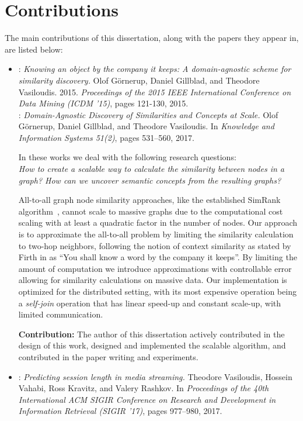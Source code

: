 \section{Contributions}

The main contributions of this dissertation, along with the papers they appear in,
are listed below:

\begin{itemize}
	\item \textbf{\conceptsicdm}: \emph{Knowing an object by the company it keeps: A domain-agnostic scheme for similarity discovery.}
	Olof G\"{o}rnerup, Daniel Gillblad, and Theodore Vasiloudis. 2015.
	\emph{Proceedings of the 2015 IEEE International Conference on Data Mining (ICDM '15)}, pages 121-130, 2015. \\
	\textbf{\conceptskais}: \emph{Domain-Agnostic Discovery of Similarities and Concepts at Scale.}
	Olof G\"{o}rnerup, Daniel Gillblad, and Theodore Vasiloudis. In \emph{Knowledge and
	Information Systems 51(2)}, pages 531--560, 2017.

	In these works we deal with the following research questions:\\
	\emph{How to create a scalable way to calculate the similarity between nodes
	in a graph? How can we uncover semantic concepts from the resulting graphs?
	}

	All-to-all graph node similarity approaches, like the established SimRank algorithm~\cite{simrank},
	cannot scale to massive graphs due to the computational cost scaling with at least a quadratic
	factor in the number of nodes. Our approach is to approximate the all-to-all problem
	by limiting the similarity calculation to two-hop neighbors, following the
	notion of context similarity as stated by Firth in \cite{firth} as ``You shall know
	a word by the company it keeps''. By limiting the amount of computation we introduce
	approximations with controllable error allowing for similarity calculations on massive
	data. Our implementation is optimized for the distributed setting, with its most
	expensive operation being a \emph{self-join} operation that has linear speed-up and
	constant scale-up, with limited communication.

	\textbf{Contribution:} The author of this dissertation actively contributed
	in the design of this work, designed and implemented the scalable algorithm, and contributed in
	the paper writing and experiments.

	\item \textbf{\sessionlength}:
	\emph{Predicting session length in media streaming.} Theodore Vasiloudis, Hossein Vahabi, Ross Kravitz, and Valery Rashkov. In \emph{Proceedings of the 40th
	International ACM SIGIR Conference on Research and Development in Information
	Retrieval (SIGIR '17)}, pages 977--980, 2017.


\end{itemize}
